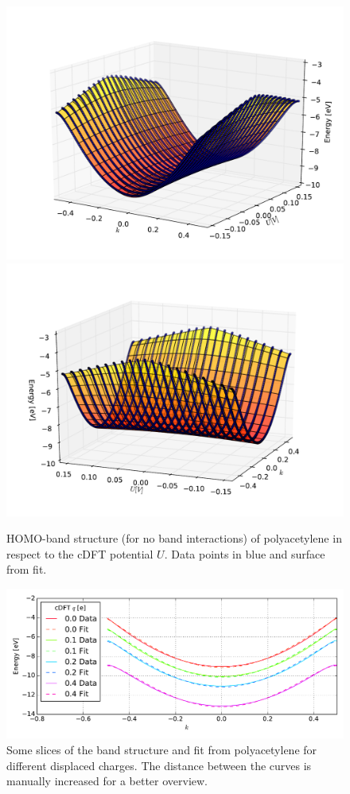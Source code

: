 \begin{figure}
	\centering
	\includegraphics[width = 13cm]{Images/polyacetylene/charging/3D/figure_1-1}
	\includegraphics[width = 13cm]{Images/polyacetylene/charging/3D/figure_1-2}
	\caption{HOMO-band structure (for no band interactions) of polyacetylene in respect to the cDFT potential $U$. Data points in blue and surface from fit.}
	\label{image_polyacetylene_2D_fit}
\end{figure}
\begin{figure}
	\centering
	\includegraphics[width = 13cm]{Images/polyacetylene/charging/3D_cuts}
	\caption{Some slices of the band structure and fit  from polyacetylene for different displaced charges. The distance between the curves is manually increased for a better overview.}
	\label{image_slices_polyacetylene}
\end{figure}
